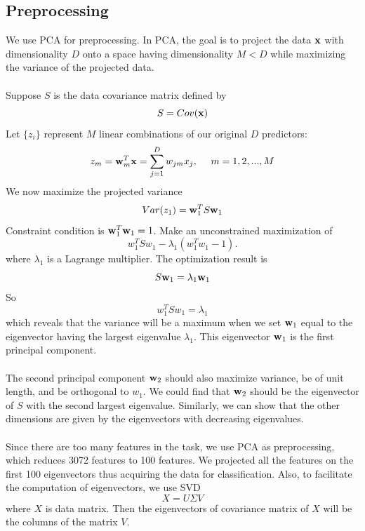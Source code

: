 \documentclass[a4paper]{article}
\newcommand{\vw}{{\bf w}}
\newcommand{\vx}{{\bf x}}
\begin{document}
\subsection{Preprocessing}
We use PCA for preprocessing. In PCA, the goal is to project the data $\vx$ with dimensionality $D$ onto a space having dimensionality $M <D$ while  maximizing the variance of the projected data.\\
\\
Suppose $S$ is the data covariance matrix defined by\begin{equation}
S=Cov(\vx)
\end{equation}
Let $\{z_i\}$ represent $M$ linear combinations of our original $D$ predictors:
\begin{equation}
z_m=\vw_m^T\vx=\sum_{j=1}^D w_{jm} x_j,~~~~m=1,2,...,M
\end{equation}
We now maximize the projected variance \begin{equation}
Var(z_1)=\vw^T_1S\vw_1
\end{equation}  
Constraint condition is $\vw^T_1\vw_1=1$. Make an unconstrained maximization of
\begin{equation}
w^T_1Sw_1-\lambda_1(w_1^T w_1-1).
\end{equation}
where $\lambda_1$ is a Lagrange multiplier. The optimization result is \begin{equation} 
S\vw_1 = \lambda_1\vw_1
\end{equation}
So\begin{equation}
w_1^TSw_1 = \lambda_1
\end{equation}
which reveals that the variance will be a maximum when we set $\vw_1$ equal to the eigenvector having the largest eigenvalue $\lambda_1$. This eigenvector $\vw_1$ is the first principal component.\\
\\
The second principal component $\vw_2$ should also maximize variance, be of unit length, and be orthogonal to $w_1$. We could find that $\vw_2$ should be the eigenvector of $S$ with the second largest eigenvalue. Similarly, we can show that the other dimensions are given by the eigenvectors with decreasing eigenvalues.\\
\\
Since there are too many features in the task, we use PCA as preprocessing, which reduces 3072 features to 100 features. We projected all the features on the first 100 eigenvectors thus acquiring the data for classification. Also, to facilitate the computation of eigenvectors, we use SVD \begin{equation}
X=U\Sigma V
\end{equation}
where $X$ is data matrix. Then the eigenvectors of covariance matrix of $X$ will be the columns of the matrix $V$.
\end{document}
